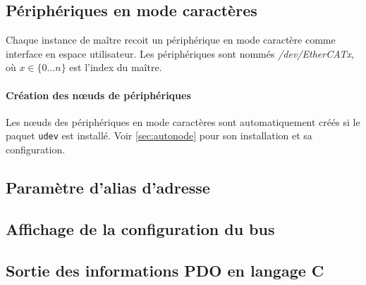 \documentclass[a4paper,12pt,BCOR=6mm,bibtotoc,idxtotoc]{scrbook}
\begin{document}
\subsection{P\'eriph\'eriques en mode caract\`eres}
\label{sec:cdev}

Chaque instance de ma\^itre recoit un p\'eriph\'erique en mode
caract\`ere comme interface en espace utilisateur.
Les p\'eriph\'eriques sont nomm\'es \textit{/dev/EtherCATx},
o\`u $x \in \{0 \ldots n\}$ est l'index du ma\^itre.


\paragraph{Cr\'eation des n\oe{}uds de p\'eriph\'eriques}
Les n\oe{}uds des p\'eriph\'eriques en mode caract\`eres sont
automatiquement cr\'e\'es si le paquet \lstinline+udev+ est
install\'e. Voir \autoref{sec:autonode} pour son installation et sa
configuration.


\subsection{Param\`etre d'alias d'adresse}
\label{sec:ethercat-alias}




\subsection{Affichage de la configuration du bus}
\label{sec:ethercat-config}




\subsection{Sortie des informations PDO en langage C}
\label{sec:ethercat-cstruct}



\end{document}

